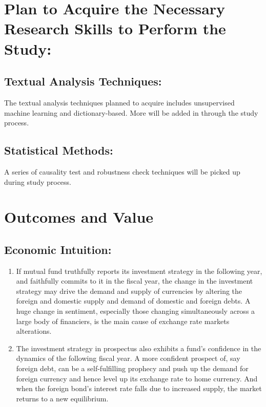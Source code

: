 \documentclass[12pt]{article} %
\begin{document}
\section{Plan to Acquire the Necessary Research Skills to Perform the Study:}
	\subsection{Textual Analysis Techniques:}
	The textual analysis techniques planned to acquire includes unsupervised machine learning and dictionary-based. More will be added in through the study process.
	\subsection{Statistical Methods:}
	A series of causality test and robustness check techniques will be picked up during study process. 

\section{Outcomes and Value}
\subsection{Economic Intuition:}
	\begin{enumerate}
		\item If mutual fund truthfully reports its investment strategy in the following year, and faithfully commits to it in the fiscal year, the change in the investment strategy may drive the demand and supply of currencies by altering the foreign and domestic supply and demand of domestic and foreign debts. A huge change in sentiment, especially those changing simultaneously across a large body of financiers, is the main cause of exchange rate markets alterations.
		\item The investment strategy in prospectus also exhibits a fund's confidence in the dynamics of the following fiscal year. A more confident prospect of, say foreign debt, can be a self-fulfilling prophecy and push up the demand for foreign currency and hence level up its exchange rate to home currency. And when the foreign bond's interest rate falls due to increased supply, the market returns to a new equilibrium.
	\end{enumerate}
\end{document}
